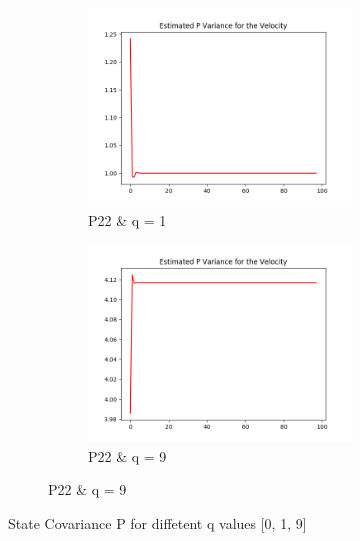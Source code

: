 \documentclass{article}
\begin{document}
\begin{figure}[H]
\begin{subfigure} {1\textwidth}
\begin{subfigure}{.3\textwidth}
                \end{subfigure}
                \begin{subfigure}{.3\textwidth}  
                    \includegraphics[width=1\linewidth]{./img/p22_1.png}
                    \caption{P22 \& q = 1 }
                \end{subfigure}
                \begin{subfigure}{.3\textwidth}
                    \includegraphics[width=1\linewidth]{./img/p22_9.png}
                    \caption{P22 \& q = 9 }
                \end{subfigure}
            \end{subfigure} 
            \caption{State Covariance P for diffetent q values [0, 1, 9]}
            \label{fig:variances}
        \end{figure}
\end{document}
